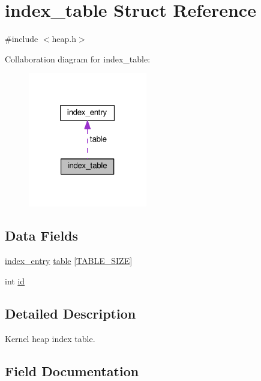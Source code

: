 \hypertarget{structindex__table}{}\section{index\+\_\+table Struct Reference}
\label{structindex__table}


{\ttfamily \#include $<$heap.\+h$>$}



Collaboration diagram for index\+\_\+table\+:\nopagebreak
\begin{figure}[H]
\begin{center}
\leavevmode
\includegraphics[width=147pt]{structindex__table__coll__graph}
\end{center}
\end{figure}
\subsection*{Data Fields}
\begin{DoxyCompactItemize}
\item 
\hyperlink{structindex__entry}{index\+\_\+entry} \hyperlink{structindex__table_ac79481e508bbe68d18d747f7af369986}{table} \mbox{[}\hyperlink{heap_8h_a032503e76d6f69bc67e99e909c8125da}{T\+A\+B\+L\+E\+\_\+\+S\+I\+ZE}\mbox{]}
\item 
int \hyperlink{structindex__table_a7441ef0865bcb3db9b8064dd7375c1ea}{id}
\end{DoxyCompactItemize}


\subsection{Detailed Description}
Kernel heap index table. 

\subsection{Field Documentation}
